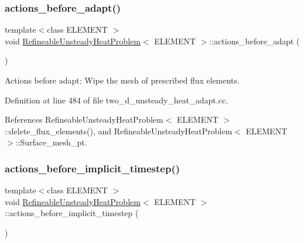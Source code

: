 \mbox{\label{classRefineableUnsteadyHeatProblem_a4419fcea0ccbf0509f1d5dd37d8301de}} 
\subsubsection{\texorpdfstring{actions\+\_\+before\+\_\+adapt()}{actions\_before\_adapt()}}
{\footnotesize\ttfamily template$<$class E\+L\+E\+M\+E\+NT $>$ \\
void \hyperlink{classRefineableUnsteadyHeatProblem}{Refineable\+Unsteady\+Heat\+Problem}$<$ E\+L\+E\+M\+E\+NT $>$\+::actions\+\_\+before\+\_\+adapt (\begin{DoxyParamCaption}{ }\end{DoxyParamCaption})}



Actions before adapt\+: Wipe the mesh of prescribed flux elements. 



Definition at line 484 of file two\+\_\+d\+\_\+unsteady\+\_\+heat\+\_\+adapt.\+cc.



References Refineable\+Unsteady\+Heat\+Problem$<$ E\+L\+E\+M\+E\+N\+T $>$\+::delete\+\_\+flux\+\_\+elements(), and Refineable\+Unsteady\+Heat\+Problem$<$ E\+L\+E\+M\+E\+N\+T $>$\+::\+Surface\+\_\+mesh\+\_\+pt.

\mbox{\label{classRefineableUnsteadyHeatProblem_ac754f1313cd6d684c149443beb5bcf9e}} 
\subsubsection{\texorpdfstring{actions\+\_\+before\+\_\+implicit\+\_\+timestep()}{actions\_before\_implicit\_timestep()}}
{\footnotesize\ttfamily template$<$class E\+L\+E\+M\+E\+NT $>$ \\
void \hyperlink{classRefineableUnsteadyHeatProblem}{Refineable\+Unsteady\+Heat\+Problem}$<$ E\+L\+E\+M\+E\+NT $>$\+::actions\+\_\+before\+\_\+implicit\+\_\+timestep (\begin{DoxyParamCaption}{ }\end{DoxyParamCaption})}



